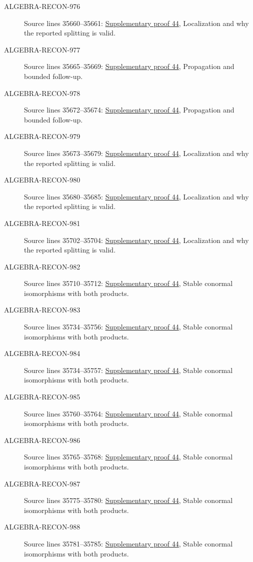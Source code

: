 \begin{description}
\item[ALGEBRA-RECON-976] Source lines 35660--35661: \hyperlink{algebra_naive_cotangent_notes_20260928}{Supplementary proof 44}, Localization and why the reported splitting is valid.
\item[ALGEBRA-RECON-977] Source lines 35665--35669: \hyperlink{algebra_naive_cotangent_notes_20260928}{Supplementary proof 44}, Propagation and bounded follow-up.
\item[ALGEBRA-RECON-978] Source lines 35672--35674: \hyperlink{algebra_naive_cotangent_notes_20260928}{Supplementary proof 44}, Propagation and bounded follow-up.
\item[ALGEBRA-RECON-979] Source lines 35673--35679: \hyperlink{algebra_naive_cotangent_notes_20260928}{Supplementary proof 44}, Localization and why the reported splitting is valid.
\item[ALGEBRA-RECON-980] Source lines 35680--35685: \hyperlink{algebra_naive_cotangent_notes_20260928}{Supplementary proof 44}, Localization and why the reported splitting is valid.
\item[ALGEBRA-RECON-981] Source lines 35702--35704: \hyperlink{algebra_naive_cotangent_notes_20260928}{Supplementary proof 44}, Localization and why the reported splitting is valid.
\item[ALGEBRA-RECON-982] Source lines 35710--35712: \hyperlink{algebra_naive_cotangent_notes_20260928}{Supplementary proof 44}, Stable conormal isomorphisms with both products.
\item[ALGEBRA-RECON-983] Source lines 35734--35756: \hyperlink{algebra_naive_cotangent_notes_20260928}{Supplementary proof 44}, Stable conormal isomorphisms with both products.
\item[ALGEBRA-RECON-984] Source lines 35734--35757: \hyperlink{algebra_naive_cotangent_notes_20260928}{Supplementary proof 44}, Stable conormal isomorphisms with both products.
\item[ALGEBRA-RECON-985] Source lines 35760--35764: \hyperlink{algebra_naive_cotangent_notes_20260928}{Supplementary proof 44}, Stable conormal isomorphisms with both products.
\item[ALGEBRA-RECON-986] Source lines 35765--35768: \hyperlink{algebra_naive_cotangent_notes_20260928}{Supplementary proof 44}, Stable conormal isomorphisms with both products.
\item[ALGEBRA-RECON-987] Source lines 35775--35780: \hyperlink{algebra_naive_cotangent_notes_20260928}{Supplementary proof 44}, Stable conormal isomorphisms with both products.
\item[ALGEBRA-RECON-988] Source lines 35781--35785: \hyperlink{algebra_naive_cotangent_notes_20260928}{Supplementary proof 44}, Stable conormal isomorphisms with both products.

\end{description}
